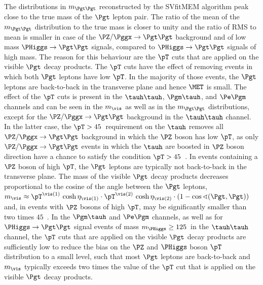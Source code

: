 The distributions in $m_{\Pgt\Pgt}$ reconstructed by the SVfitMEM algorithm 
peak close to the true mass of the $\Pgt$ lepton pair.
The ratio of the mean of the $m_{\Pgt\Pgt}$ distribution to the true mass is closer to unity and the ratio of RMS to mean is smaller
in case of the $\PZ/\Pggx \to \Pgt\Pgt$ background and of low mass $\PHiggs \to \Pgt\Pgt$ signals, compared to $\PHiggs \to \Pgt\Pgt$ signals of high mass.
The reason for this behaviour are the $\pT$ cuts that are applied on the visible $\Pgt$ decay products.
The $\pT$ cuts have the effect of removing events in which both $\Pgt$
leptons have low $\pT$.
In the majority of those events,
the $\Pgt$ leptons are back-to-back in the transverse plane
and hence $\MET$ is small.
The effect of the $\pT$ cuts is present in the $\tauh\tauh$, $\Pgm\tauh$, and $\Pe\Pgm$ channels and can be seen in the $m_{\vis}$ as well as in the $m_{\Pgt\Pgt}$ distributions,
except for the $\PZ/\Pggx \to \Pgt\Pgt$ background in the $\tauh\tauh$ channel.
In the latter case,
the $\pT > 45$~\GeV requirement on the $\tauh$ 
removes all $\PZ/\Pggx \to \Pgt\Pgt$ background in which the $\PZ$ boson has low $\pT$,
as only $\PZ/\Pggx \to \Pgt\Pgt$ events in which the $\tauh$ are boosted in $\PZ$ boson direction have a chance to satisfy the condition $\pT > 45$~\GeV.
In events containing a $\PZ$ boson of high $\pT$,
the $\Pgt$ leptons are typically not back-to-back in the transverse plane.
The mass of the visible $\Pgt$ decay products decreases proportional to the cosine of the angle between the $\Pgt$ leptons,
$m_{\vis} \approx \pT^{\vis(1)} \, \cosh\eta_{\vis(1)} \cdot
\pT^{\vis(2)} \, \cosh\eta_{\vis(2)} \cdot \left( 1 - \cos\sphericalangle(\Pgt,\Pgt) \right)$
and, in events with $\PZ$ bosons of high $\pT$, may be significantly smaller than two times $45$~\GeV.
In the $\Pgm\tauh$ and $\Pe\Pgm$ channels, as well as for $\PHiggs \to \Pgt\Pgt$ signal events of mass $m_{\PHiggs} \geq 125$~\GeV in the $\tauh\tauh$ channel,
the $\pT$ cuts that are applied on the visible $\Pgt$ decay products 
are sufficiently low to reduce the bias on the $\PZ$ and $\PHiggs$ boson $\pT$ distribution to a small level,
such that most $\Pgt$ leptons are back-to-back and $m_{\vis}$
typically exceeds two times the value of the $\pT$ cut that is applied on the visible $\Pgt$ decay products.

